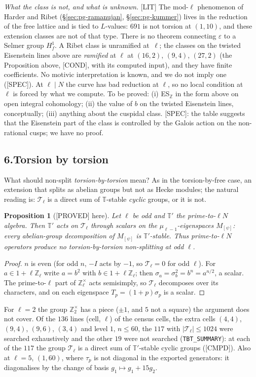 \documentclass[11pt]{article}
\newcommand{\Z}{\mathbb{Z}}
\newcommand{\code}[1]{\texttt{#1}}
\newcommand{\PROVED}{\textsf{\small[PROVED]}}
\newcommand{\LIT}{\textsf{\small[LIT]}}
\newcommand{\CMPD}{\textsf{\small[CMPD]}}
\newcommand{\PGCOND}{\textsf{\small[COND]}}
\newcommand{\PGSPEC}{\textsf{\small[SPEC]}}
\newtheorem*{proposition*}{Proposition}
\begin{document}
\emph{What the class is not, and what is unknown.} \LIT{} The mod-$\ell$ phenomenon of Harder and Ribet (\S\ref{sec:pg-ramanujan}, \S\ref{sec:pg-kummer}) lives in the reduction of the free lattice and is tied to $L$-values: $691$ is not torsion at $(1,10)$, and these extension classes are not of that type. There is no theorem connecting $\varepsilon$ to a Selmer group $H^{1}_f$. A Ribet class is unramified at~$\ell$; the classes on the twisted Eisenstein lines above are \emph{ramified} at $\ell$ at $(16,2)$, $(9,4)$, $(27,2)$ (the Proposition above, \PGCOND{}, with its computed input), and they have finite coefficients. No motivic interpretation is known, and we do not imply one (\PGSPEC). At $\ell\mid N$ the curve has bad reduction at $\ell$, so no local condition at~$\ell$ is forced by what we compute. To be proved: (i) ES$_{\Z}$ in the form above on open integral cohomology; (ii) the value of $b$ on the twisted Eisenstein lines, conceptually; (iii) anything about the cuspidal class. \PGSPEC: the table suggests that the Eisenstein part of the class is controlled by the Galois action on the non-rational cusps; we have no proof.

\subsection*{6.\quad Torsion by torsion}

What should non-split \emph{torsion-by-torsion} mean? As in the torsion-by-free case, an extension that splits as abelian groups but not as Hecke modules; the natural reading is: $\mathcal T_\ell$ is a direct sum of $\mathbb T$-stable \emph{cyclic} groups, or it is not.

\begin{proposition*}[\PROVED{} here] Let $\ell$ be odd and $\mathbb T'$ the prime-to-$\ell N$ algebra. Then $\mathbb T'$ acts on $\mathcal T_\ell$ through scalars on the $\mu_{\ell-1}$-eigenspaces $M_{[\psi]}$: every abelian-group decomposition of $M_{[\psi]}$ is $\mathbb T'$-stable. Thus prime-to-$\ell N$ operators produce no torsion-by-torsion non-splitting at odd $\ell$.
\end{proposition*}
\begin{proof} $n$ is even (for odd $n$, $-I$ acts by $-1$, so $\mathcal T_\ell=0$ for odd $\ell$). For $a\in1+\ell\Z_\ell$ write $a=b^{2}$ with $b\in1+\ell\Z_\ell$; then $\sigma_a=\sigma_b^{2}=b^{n}=a^{n/2}$, a scalar. The prime-to-$\ell$ part of $\Z_\ell^\times$ acts semisimply, so $\mathcal T_\ell$ decomposes over its characters, and on each eigenspace $T_p=(1+p)\sigma_p$ is a scalar.\end{proof}
For $\ell=2$ the group $\Z_2^\times$ has a piece ($\pm1$, and $5$ not a square) the argument does not cover. Of the $136$ lines (cell, $\ell$) of the census cells, the extra cells $(4,4)$, $(9,4)$, $(9,6)$, $(3,4)$ and level $1$, $n\le60$, the $117$ with $\lvert\mathcal T_\ell\rvert\le1024$ were searched exhaustively and the other $19$ were not searched (\code{TBT\_SUMMARY}): at each of the $117$ the group $\mathcal T_\ell$ is a direct sum of $\mathbb T'$-stable cyclic groups (\CMPD). Also at $\ell=5$, $(1,60)$, where $\tau_p$ is not diagonal in the exported generators: it diagonalises by the change of basis $g_1\mapsto g_1+15g_2$.
\end{document}
